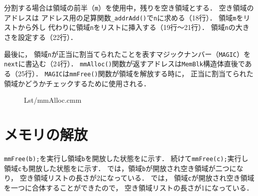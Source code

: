 分割する場合は領域の前半（{\tt m}）を使用中，残りを空き領域とする．
空き領域のアドレスは
アドレス用の足算関数{\tt \_addrAdd()}で{\tt n}に求める（18行）．
領域{\tt m}をリストから外し
代わりに領域{\tt n}をリストに挿入する（19行〜21行）．
領域{\tt n}の大きさを設定する（22行）．

最後に，
領域{\tt n}が正当に割当てられたことを表すマジックナンバー（{\tt MAGIC}）を
{\tt next}に書込む（24行）．
{\tt mmAlloc()}関数が返すアドレスは{\tt MemBlk}構造体直後である（25行）．
{\tt MAGIC}は{\tt mmFree()}関数が領域を解放する時に，
正当に割当てられた領域かどうかチェックするために使用される．

\begin{figure}[btph]

{Lst/mmAlloc.cmm}
\end{figure}

\section{メモリの解放}
{\tt mmFree(b);}を実行し領域{\tt b}を開放した状態をに示す．
続けて{\tt mmFree(c);}実行し領域{\tt c}も開放した状態をに示す．
では，領域{\tt b}が開放され空き領域が二つになり，
空き領域リストの長さが2になっている．
では，
領域{\tt c}が開放され空き領域を一つに合体することができたので，
空き領域リストの長さが1になっている．

